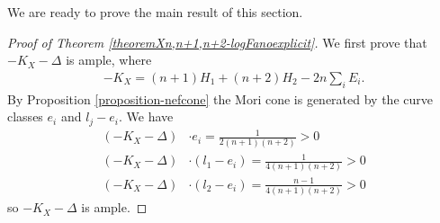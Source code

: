 \documentclass[a4paper,11pt]{article}
\begin{document}
We are ready to prove the main result of this section.

\begin{proof}[Proof of Theorem \ref{theoremXn,n+1,n+2-logFanoexplicit}]
We first prove that $-K_X-\Delta$ is ample, where 
\begin{align*}
-K_X=(n+1)H_1+(n+2)H_2-2n\sum_{i}E_i.    
\end{align*}
By Proposition \ref{proposition-nefcone} the Mori cone is generated by the curve classes $e_i$ and $l_j-e_i$. We have
\begin{align*}
(-K_X-\Delta)&\cdot e_i=
\frac{1}{2(n+1)(n+2)}>0\\
(-K_X-\Delta)&\cdot (l_1-e_i)=
\frac{1}{4(n+1)(n+2)}>0\\
(-K_X-\Delta)&\cdot (l_2-e_i)=
\frac{n-1}{4(n+1)(n+2)}>0    
\end{align*}
so $-K_X-\Delta$ is ample.



\end{proof}
\end{document}
